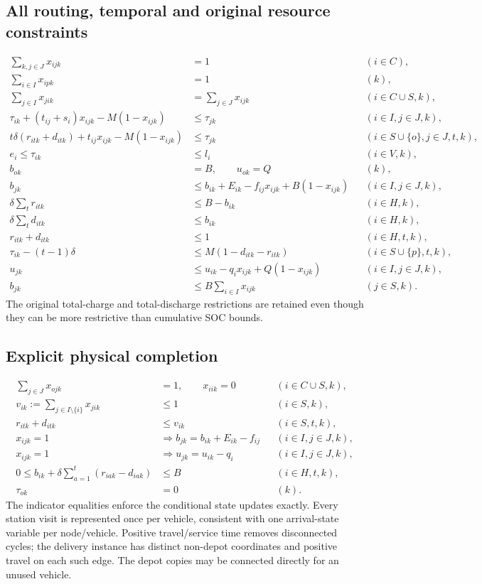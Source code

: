 \documentclass{article}
\begin{document}
\subsection*{All routing, temporal and original resource constraints}
\begin{align}
\sum_{k,j\in J}x_{ijk}&=1 &&(i\in C),\\
\sum_{i\in I}x_{ipk}&=1 &&(k),\\
\sum_{j\in I}x_{jik}&=\sum_{j\in J}x_{ijk} &&(i\in C\cup S,k),\\
\tau_{ik}+(t_{ij}+s_i)x_{ijk}-M(1-x_{ijk})&\le\tau_{jk}&&(i\in I,j\in J,k),\\
t\delta(r_{itk}+d_{itk})+t_{ij}x_{ijk}-M(1-x_{ijk})&\le\tau_{jk}&&(i\in S\cup\{o\},j\in J,t,k),\\
e_i\le\tau_{ik}&\le l_i&&(i\in V,k),\\
b_{ok}&=B,\qquad u_{ok}=Q&&(k),\\
b_{jk}&\le b_{ik}+E_{ik}-f_{ij}x_{ijk}+B(1-x_{ijk})&&(i\in I,j\in J,k),\\
\delta\sum_t r_{itk}&\le B-b_{ik}&&(i\in H,k),\\
\delta\sum_t d_{itk}&\le b_{ik}&&(i\in H,k),\\
r_{itk}+d_{itk}&\le1&&(i\in H,t,k),\\
\tau_{ik}-(t-1)\delta&\le M(1-d_{itk}-r_{itk})&&(i\in S\cup\{p\},t,k),\\
u_{jk}&\le u_{ik}-q_ix_{ijk}+Q(1-x_{ijk})&&(i\in I,j\in J,k),\\
b_{jk}&\le B\sum_{i\in I}x_{ijk}&&(j\in S,k).
\end{align}
The original total-charge and total-discharge restrictions are retained
even though they can be more restrictive than cumulative SOC bounds.

\subsection*{Explicit physical completion}
\begin{align}
\sum_{j\in J}x_{ojk}&=1,\qquad x_{iik}=0&&(i\in C\cup S,k),\\
v_{ik}:=\sum_{j\in I\setminus\{i\}}x_{jik}&\le1&&(i\in S,k),\\
r_{itk}+d_{itk}&\le v_{ik}&&(i\in S,t,k),\\
x_{ijk}=1&\Longrightarrow b_{jk}=b_{ik}+E_{ik}-f_{ij}&&(i\in I,j\in J,k),\\
x_{ijk}=1&\Longrightarrow u_{jk}=u_{ik}-q_i&&(i\in I,j\in J,k),\\
0\le b_{ik}+\delta\sum_{a=1}^{t}(r_{iak}-d_{iak})&\le B&&(i\in H,t,k),\\
\tau_{ok}&=0&&(k).
\end{align}
The indicator equalities enforce the conditional state updates exactly. Every station visit is represented once per vehicle, consistent
with one arrival-state variable per node/vehicle. Positive travel/service
time removes disconnected cycles; the delivery instance has distinct
non-depot coordinates and positive travel on each such edge. The depot
copies may be connected directly for an unused vehicle.
\end{document}

